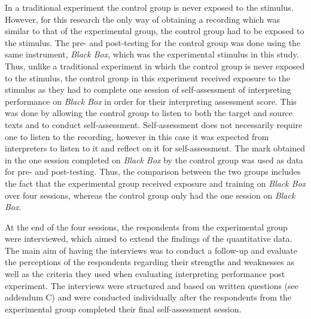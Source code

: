\documentclass[output=paper]{langsci/langscibook}
\begin{document}
In a traditional experiment the control group is never exposed to the stimulus. However, for this research the only way of obtaining a recording which was similar to that of the experimental group, the control group had to be exposed to the stimulus. The pre- and post-testing for the control group was done using the same instrument, \textit{Black Box}, which was the experimental stimulus in this study. Thus, unlike a traditional experiment in which the control group is never exposed to the stimulus, the control group in this experiment received exposure to the stimulus as they had to complete one session of self-assessment of interpreting performance on \textit{Black Box} in order for their interpreting assessment score. This was done by allowing the control group to listen to both the target and source texts and to conduct self-assessment. Self-assessment does not necessarily require one to listen to the recording, however in this case it was expected from interpreters to listen to it and reflect on it for self-assessment. The mark obtained in the one session completed on \textit{Black Box} by the control group was used as data for pre- and post-testing. Thus, the comparison between the two groups includes the fact that the experimental group received exposure and training on \textit{Black Box} over four sessions, whereas the control group only had the one session on \textit{Black Box}.

At the end of the four sessions, the respondents from the experimental group were interviewed, which aimed to extend the findings of the quantitative data. The main aim of having the interviews was to conduct a follow-up and evaluate the perceptions of the respondents regarding their strengths and weaknesses as well as the criteria they used when evaluating interpreting performance post experiment. The interviews were structured and based on written questions (see addendum C) and were conducted individually after the respondents from the experimental group completed their final self-assessment session.
\end{document}
